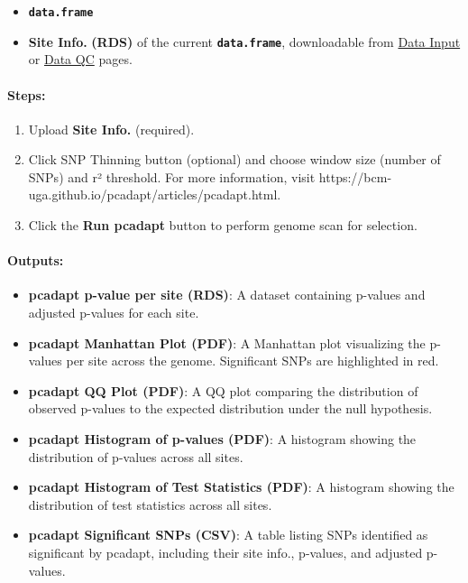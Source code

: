 \documentclass[
]{book}
\providecommand{\tightlist}{%
  \setlength{\itemsep}{0pt}\setlength{\parskip}{0pt}}
\begin{document}
\begin{itemize}
\tightlist
\item
  {\textbf{\texttt{data.frame}}}
\item
  \textbf{Site Info.} \textbf{(RDS)} of the current {\textbf{\texttt{data.frame}}}, downloadable from \ul{Data Input} or \ul{Data QC} pages.
\end{itemize}

\paragraph*{\texorpdfstring{\textbf{Steps:}}{Steps:}}\label{steps-7}

\begin{enumerate}
\def\labelenumi{\arabic{enumi}.}
\item
  {Upload} \textbf{Site Info.} (required).
\item
  Click {SNP Thinning} button (optional) and choose window size (number of SNPs) and r² threshold. For more information, visit https://bcm-uga.github.io/pcadapt/articles/pcadapt.html.
\item
  Click the {\textbf{Run pcadapt}} button to perform genome scan for selection.
\end{enumerate}

\paragraph*{Outputs:}\label{outputs-16}

\begin{itemize}
\item
  \textbf{pcadapt p-value per site (RDS)}: A dataset containing p-values and adjusted p-values for each site.
\item
  \textbf{pcadapt Manhattan Plot (PDF)}: A Manhattan plot visualizing the p-values per site across the genome. Significant SNPs are highlighted in red.
\item
  \textbf{pcadapt QQ Plot (PDF)}: A QQ plot comparing the distribution of observed p-values to the expected distribution under the null hypothesis.
\item
  \textbf{pcadapt Histogram of p-values (PDF)}: A histogram showing the distribution of p-values across all sites.
\item
  \textbf{pcadapt Histogram of Test Statistics (PDF)}: A histogram showing the distribution of test statistics across all sites.
\item
  \textbf{pcadapt Significant SNPs (CSV)}: A table listing SNPs identified as significant by pcadapt, including their site info., p-values, and adjusted p-values.
\end{itemize}
\end{document}

